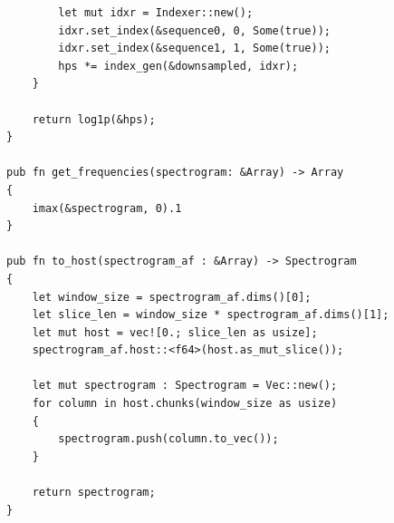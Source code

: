 \documentclass[a4paper,12pt]{report}
\begin{document}
\begin{verbatim}
        let mut idxr = Indexer::new();            
        idxr.set_index(&sequence0, 0, Some(true));
        idxr.set_index(&sequence1, 1, Some(true)); 
        hps *= index_gen(&downsampled, idxr);
    }

    return log1p(&hps);
}

pub fn get_frequencies(spectrogram: &Array) -> Array
{
    imax(&spectrogram, 0).1
}

pub fn to_host(spectrogram_af : &Array) -> Spectrogram
{
    let window_size = spectrogram_af.dims()[0];
    let slice_len = window_size * spectrogram_af.dims()[1];
    let mut host = vec![0.; slice_len as usize];
    spectrogram_af.host::<f64>(host.as_mut_slice());

    let mut spectrogram : Spectrogram = Vec::new();
    for column in host.chunks(window_size as usize)
    {
        spectrogram.push(column.to_vec());
    }

    return spectrogram;
}
\end{verbatim}
\newpage
\end{document}
